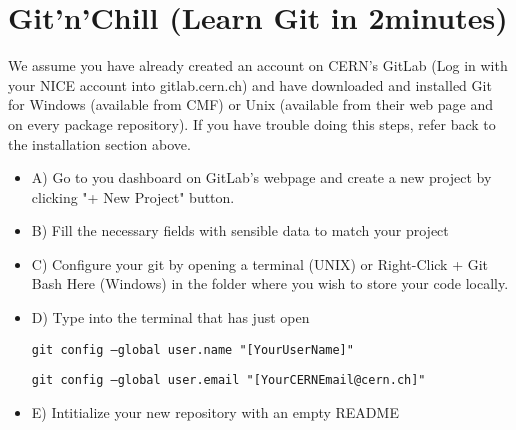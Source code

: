 \documentclass[runningheads,a4paper]{llncs}
\begin{document}
\section{Git'n'Chill (Learn Git in 2minutes)}

We assume you have already created an account on CERN's GitLab (Log in with your NICE account into gitlab.cern.ch) and have downloaded and installed Git for Windows (available from CMF) or Unix (available from their web page and on every package repository). If you have trouble doing this steps, refer back to the installation section above.

\begin{itemize}
    
\item A) Go to you dashboard on GitLab's webpage and create a new project by clicking "+ New Project" button. \newline

    
\item B) Fill the necessary fields with sensible data to match your project  \newline
    
\item {C) Configure your git by opening a terminal (UNIX) or Right-Click + Git Bash Here (Windows) in the folder where you wish to store your code locally.} \newline

\item D) Type into the terminal that has just open

        \indent  \texttt{git config --global user.name "[YourUserName]"}

        \indent  \texttt{git config --global user.email "[YourCERNEmail@cern.ch]"}\newline


\item E) Intitialize your new repository with an empty README

    \newline
            


\end{itemize}
\end{document}

